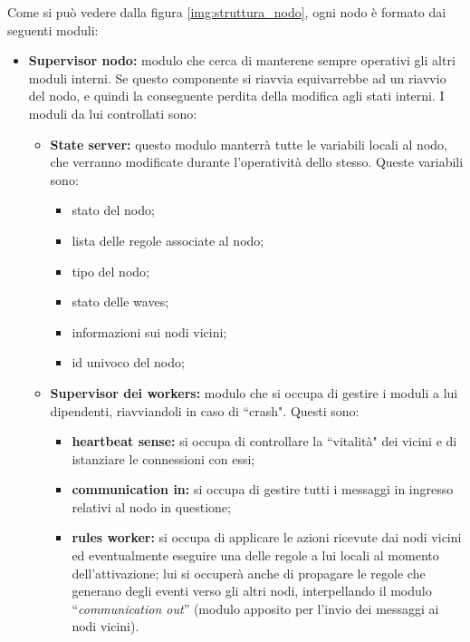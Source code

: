 \documentclass{memoir}
\begin{document}
Come si può vedere dalla figura \ref{img:struttura_nodo}, ogni nodo è formato dai
	   seguenti moduli:
\begin{itemize}
	\item \textbf{Supervisor nodo:} modulo che cerca di manterene sempre operativi gli
	   altri moduli interni. Se questo componente si riavvia equivarrebbe ad un riavvio
	   del nodo, e quindi la conseguente perdita della modifica agli stati interni.
	   I moduli
	   da lui controllati sono:
	\begin{itemize}
	\item \textbf{State server:} questo modulo manterrà tutte le variabili locali al
	   nodo, che verranno modificate durante l'operatività dello stesso. Queste variabili
	   sono:
		\begin{itemize}
		\item stato del nodo;
		\item lista delle regole associate al nodo;
		\item tipo del nodo;
		\item stato delle waves; %
		\item informazioni sui nodi vicini;
		\item id univoco del nodo;
		\end{itemize}
	\item \textbf{Supervisor dei workers:} modulo che si occupa di gestire i moduli
	   a lui dipendenti, riavviandoli in caso di ``crash". Questi sono:
		\begin{itemize}
		\item \textbf{heartbeat sense:} si occupa di controllare la ``vitalità" dei vicini
	   e di istanziare le connessioni con essi;
		\item \textbf{communication in:} si occupa di gestire tutti i messaggi in ingresso
	   relativi al nodo in questione;
		\item \textbf{rules worker:} si occupa di applicare le azioni ricevute dai nodi
	   vicini ed eventualmente eseguire una delle regole a lui locali al momento dell'attivazione;
	   lui si occuperà anche di propagare le regole che generano degli eventi verso
	   gli
	   altri nodi, interpellando il modulo ``\textit{communication out}'' 
	  (modulo apposito per l'invio dei messaggi ai nodi vicini).
		\end{itemize}
	\end{itemize}
\end{itemize}
\end{document}
